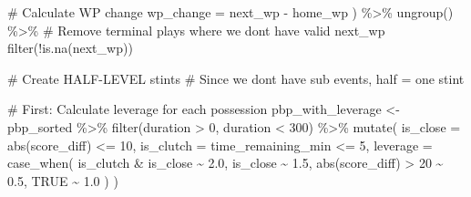 \documentclass[
  letterpaper,
  DIV=11,
  numbers=noendperiod]{scrartcl}
\newenvironment{Shaded}{\begin{snugshade}}{\end{snugshade}}
\newcommand{\AttributeTok}[1]{\textcolor[rgb]{0.40,0.45,0.13}{#1}}
\newcommand{\CommentTok}[1]{\textcolor[rgb]{0.37,0.37,0.37}{#1}}
\newcommand{\ConstantTok}[1]{\textcolor[rgb]{0.56,0.35,0.01}{#1}}
\newcommand{\DecValTok}[1]{\textcolor[rgb]{0.68,0.00,0.00}{#1}}
\newcommand{\FloatTok}[1]{\textcolor[rgb]{0.68,0.00,0.00}{#1}}
\newcommand{\FunctionTok}[1]{\textcolor[rgb]{0.28,0.35,0.67}{#1}}
\newcommand{\NormalTok}[1]{\textcolor[rgb]{0.00,0.23,0.31}{#1}}
\newcommand{\OtherTok}[1]{\textcolor[rgb]{0.00,0.23,0.31}{#1}}
\newcommand{\SpecialCharTok}[1]{\textcolor[rgb]{0.37,0.37,0.37}{#1}}
\begin{document}
\begin{Shaded}
\begin{Highlighting}[]
    \CommentTok{\# Calculate WP change}
    \AttributeTok{wp\_change =}\NormalTok{ next\_wp }\SpecialCharTok{{-}}\NormalTok{ home\_wp}
\NormalTok{  ) }\SpecialCharTok{\%\textgreater{}\%}
  \FunctionTok{ungroup}\NormalTok{() }\SpecialCharTok{\%\textgreater{}\%}
  \CommentTok{\# Remove terminal plays where we don\textquotesingle{}t have valid next\_wp}
  \FunctionTok{filter}\NormalTok{(}\SpecialCharTok{!}\FunctionTok{is.na}\NormalTok{(next\_wp))}

\CommentTok{\# Create HALF{-}LEVEL stints}
\CommentTok{\# Since we don\textquotesingle{}t have sub events, half = one stint}

\CommentTok{\# First: Calculate leverage for each possession}
\NormalTok{pbp\_with\_leverage }\OtherTok{\textless{}{-}}\NormalTok{ pbp\_sorted }\SpecialCharTok{\%\textgreater{}\%}
  \FunctionTok{filter}\NormalTok{(duration }\SpecialCharTok{\textgreater{}} \DecValTok{0}\NormalTok{, duration }\SpecialCharTok{\textless{}} \DecValTok{300}\NormalTok{) }\SpecialCharTok{\%\textgreater{}\%}
  \FunctionTok{mutate}\NormalTok{(}
    \AttributeTok{is\_close =} \FunctionTok{abs}\NormalTok{(score\_diff) }\SpecialCharTok{\textless{}=} \DecValTok{10}\NormalTok{,}
    \AttributeTok{is\_clutch =}\NormalTok{ time\_remaining\_min }\SpecialCharTok{\textless{}=} \DecValTok{5}\NormalTok{,}
    \AttributeTok{leverage =} \FunctionTok{case\_when}\NormalTok{(}
\NormalTok{      is\_clutch }\SpecialCharTok{\&}\NormalTok{ is\_close }\SpecialCharTok{\textasciitilde{}} \FloatTok{2.0}\NormalTok{,}
\NormalTok{      is\_close }\SpecialCharTok{\textasciitilde{}} \FloatTok{1.5}\NormalTok{,}
      \FunctionTok{abs}\NormalTok{(score\_diff) }\SpecialCharTok{\textgreater{}} \DecValTok{20} \SpecialCharTok{\textasciitilde{}} \FloatTok{0.5}\NormalTok{,}
      \ConstantTok{TRUE} \SpecialCharTok{\textasciitilde{}} \FloatTok{1.0}
\NormalTok{    )}
\NormalTok{  )}


\end{Highlighting}
\end{Shaded}
\end{document}

